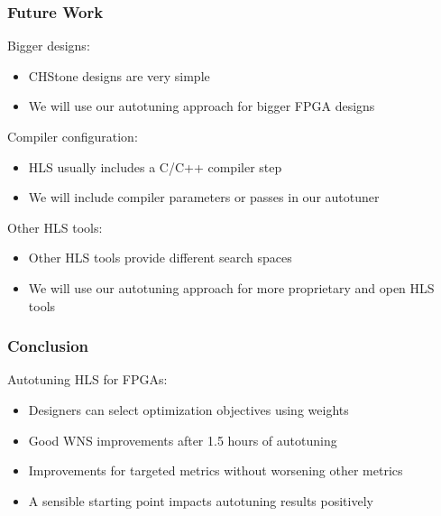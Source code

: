 \documentclass[10pt, compress, xcolor={table,xcdraw,usenames}, aspectratio=169]{beamer}
\begin{document}
\begin{frame}
    \frametitle{Future Work}
    \begin{block}{\alert{Bigger designs}:}
        \begin{itemize}
            \item CHStone \alert{designs are very simple}
            \item We will use our autotuning approach for \alert{bigger FPGA
                designs}
        \end{itemize}
    \end{block}

    \begin{block}{\alert{Compiler configuration}:}
        \begin{itemize}
            \item HLS usually includes a C/C++ \alert{compiler step}
            \item We will include \alert{compiler parameters or passes} in our
                autotuner
        \end{itemize}
    \end{block}

    \begin{block}{\alert{Other HLS tools}:}
        \begin{itemize}
            \item Other HLS tools provide \alert{different search spaces}
            \item We will use our autotuning approach for more
                \alert{proprietary and open HLS tools}
        \end{itemize}
    \end{block}
\end{frame}

\begin{frame}
    \frametitle{Conclusion}
    \begin{block}{Autotuning HLS for FPGAs:}
        \begin{itemize}
            \item Designers can \alert{select optimization objectives using
                weights}
            \item Good \alert{WNS improvements} after \alert{1.5 hours} of
                autotuning
            \item Improvements for targeted metrics \alert{without worsening
                other metrics}
            \item A \alert{sensible starting point} impacts autotuning results
                positively
        \end{itemize}
    \end{block}
\end{frame}

\maketitle
\end{document}

